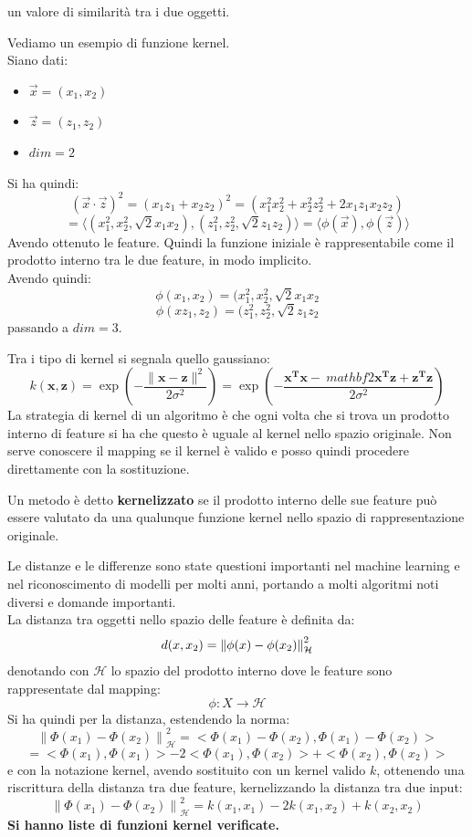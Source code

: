 \documentclass[a4paper,12pt, oneside]{book}
\begin{document}
un valore di similarità tra i due oggetti. 
\begin{esempio}
  Vediamo un esempio di funzione kernel. \\
  Siano dati:
  \begin{itemize}
    \item $\vec{x}=(x_1,x_2)$
    \item $\vec{z}=(z_1,z_2)$
    \item $dim=2$
  \end{itemize}
  Si ha quindi:
  \[(\vec{x}\cdot\vec{z})^2=(x_1z_1+x_2z_2)^2
    =(x_1^2x_2^2+x_2^2z_2^2+2x_1z_1x_2z_2)\]
  \[=\langle\left(x_{1}^{2}, x_{2}^{2}, \sqrt{2} x_{1}
      x_{2}\right),\left(z_{1}^{2}, z_{2}^{2}, \sqrt{2} z_{1}
      z_{2}\right)\rangle=\langle\phi(\vec{x}),\phi(\vec{z})\rangle\]
  Avendo ottenuto le feature. Quindi la funzione iniziale è rappresentabile come
  il prodotto interno tra le due feature, in modo implicito.\\
  Avendo quindi:
  \[\phi(x_1,x_2)=(x_1^2,x_2^2,\sqrt{2}x_1x_2\]
  \[\phi(xz_1,z_2)=(z_1^2,z_2^2,\sqrt{2}z_1z_2\]
  passando a $dim=3$.
\end{esempio}
Tra i tipo di kernel si segnala quello gaussiano:
\[ k(\mathbf{x}, \mathbf{z}) =\exp \left(-\frac{\|\mathbf{x}-
      \mathbf{z}\|^{2}}{2 \sigma^{2}}\right) 
  =\exp \left(-\frac{\mathbf{x}^{\mathbf{T}} \mathbf{x}-\
      mathbf{2} \mathbf{x}^{\mathbf{T}} \mathbf{z}+
      \mathbf{z}^{\mathbf{T}} \mathbf{z}}{2 \sigma^{2}}\right)\]
La strategia di kernel di un algoritmo è che ogni volta che si trova un prodotto
interno di feature si ha che questo è uguale al kernel nello spazio
originale. Non serve conoscere il mapping se il kernel è valido e posso quindi
procedere direttamente con la sostituzione.
\begin{definizione}
  Un metodo è detto \textbf{kernelizzato} se il prodotto interno delle sue
  feature può essere valutato da una qualunque funzione kernel nello spazio di
  rappresentazione originale.
\end{definizione}
Le distanze e le differenze sono state questioni importanti nel machine
learning e nel riconoscimento di modelli per molti anni, portando a molti
algoritmi noti diversi e domande importanti.\\
La distanza tra oggetti nello spazio delle feature è definita da:
\[d(x,x_2)=\norm{\phi(x)-\phi(x_2)}^2_{\mathcal{H}}\]
denotando con $\mathcal{H}$ lo spazio del prodotto interno dove le feature sono
rappresentate dal mapping:
\[\phi:X\to \mathcal{H}\]
Si ha quindi per la distanza, estendendo la norma:
\[
  \left\|\Phi\left(x_{1}\right)-\Phi\left(x_{2}\right)\right\|_{\mathcal{H}}^{2}
  =<\Phi\left(x_{1}\right)-\Phi\left(x_{2}\right),
    \Phi\left(x_{1}\right)-\Phi\left(x_{2}\right)>\]
    \[
  =<\Phi\left(x_{1}\right), \Phi\left(x_{1}\right)>-2<\Phi
  \left(x_{1}\right), \Phi\left(x_{2}\right)>+<\Phi\left(x_{2}\right),
  \Phi\left(x_{2}\right)>
\]
e con la notazione kernel, avendo sostituito con un kernel valido $k$, ottenendo
una riscrittura della distanza tra due feature, kernelizzando la distanza tra
due input:
\[\left\|\Phi\left(x_{1}\right)-\Phi\left(x_{2}\right)\right\|_{\mathcal{H}}^{2}
  =k(x_1,x_1)-2k(x_1,x_2)+k(x_2,x_2)\]
\textbf{Si hanno liste di funzioni kernel verificate.}
\end{document}
